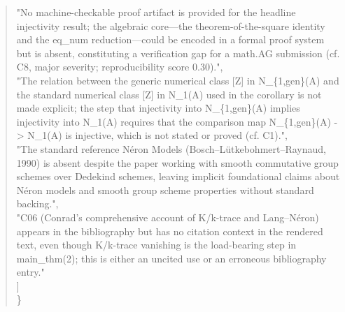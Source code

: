 \documentclass[11pt]{article}
\begin{document}
\begin{quote}
    "No machine-checkable proof artifact is provided for the headline injectivity result; the algebraic core---the theorem-of-the-square identity and the eq\_num reduction---could be encoded in a formal proof system but is absent, constituting a verification gap for a math.AG submission (cf. C8, major severity; reproducibility score 0.30).",\\
    "The relation between the generic numerical class [Z] in N\_\{1,gen\}(A) and the standard numerical class [Z] in N\_1(A) used in the corollary is not made explicit; the step that injectivity into N\_\{1,gen\}(A) implies injectivity into N\_1(A) requires that the comparison map N\_\{1,gen\}(A) -> N\_1(A) is injective, which is not stated or proved (cf. C1).",\\
    "The standard reference Néron Models (Bosch--Lütkebohmert--Raynaud, 1990) is absent despite the paper working with smooth commutative group schemes over Dedekind schemes, leaving implicit foundational claims about Néron models and smooth group scheme properties without standard backing.",\\
    "C06 (Conrad's comprehensive account of K/k-trace and Lang--Néron) appears in the bibliography but has no citation context in the rendered text, even though K/k-trace vanishing is the load-bearing step in main\_thm(2); this is either an uncited use or an erroneous bibliography entry."\\
  ]\\
\}\\
\end{quote}
\end{document}
